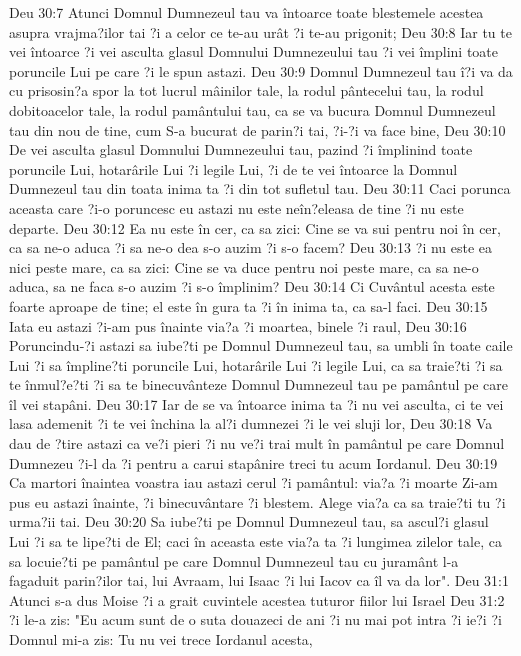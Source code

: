 Deu 30:7  Atunci Domnul Dumnezeul tau va întoarce toate blestemele acestea asupra vrajma?ilor tai ?i a celor ce te-au urât ?i te-au prigonit;
Deu 30:8  Iar tu te vei întoarce ?i vei asculta glasul Domnului Dumnezeului tau ?i vei împlini toate poruncile Lui pe care ?i le spun astazi.
Deu 30:9  Domnul Dumnezeul tau î?i va da cu prisosin?a spor la tot lucrul mâinilor tale, la rodul pântecelui tau, la rodul dobitoacelor tale, la rodul pamântului tau, ca se va bucura Domnul Dumnezeul tau din nou de tine, cum S-a bucurat de parin?i tai, ?i-?i va face bine,
Deu 30:10  De vei asculta glasul Domnului Dumnezeului tau, pazind ?i împlinind toate poruncile Lui, hotarârile Lui ?i legile Lui, ?i de te vei întoarce la Domnul Dumnezeul tau din toata inima ta ?i din tot sufletul tau.
Deu 30:11  Caci porunca aceasta care ?i-o poruncesc eu astazi nu este neîn?eleasa de tine ?i nu este departe.
Deu 30:12  Ea nu este în cer, ca sa zici: Cine se va sui pentru noi în cer, ca sa ne-o aduca ?i sa ne-o dea s-o auzim ?i s-o facem?
Deu 30:13  ?i nu este ea nici peste mare, ca sa zici: Cine se va duce pentru noi peste mare, ca sa ne-o aduca, sa ne faca s-o auzim ?i s-o împlinim?
Deu 30:14  Ci Cuvântul acesta este foarte aproape de tine; el este în gura ta ?i în inima ta, ca sa-l faci.
Deu 30:15  Iata eu astazi ?i-am pus înainte via?a ?i moartea, binele ?i raul,
Deu 30:16  Poruncindu-?i astazi sa iube?ti pe Domnul Dumnezeul tau, sa umbli în toate caile Lui ?i sa împline?ti poruncile Lui, hotarârile Lui ?i legile Lui, ca sa traie?ti ?i sa te înmul?e?ti ?i sa te binecuvânteze Domnul Dumnezeul tau pe pamântul pe care îl vei stapâni.
Deu 30:17  Iar de se va întoarce inima ta ?i nu vei asculta, ci te vei lasa ademenit ?i te vei închina la al?i dumnezei ?i le vei sluji lor,
Deu 30:18  Va dau de ?tire astazi ca ve?i pieri ?i nu ve?i trai mult în pamântul pe care Domnul Dumnezeu ?i-l da ?i pentru a carui stapânire treci tu acum Iordanul.
Deu 30:19  Ca martori înaintea voastra iau astazi cerul ?i pamântul: via?a ?i moarte Zi-am pus eu astazi înainte, ?i binecuvântare ?i blestem. Alege via?a ca sa traie?ti tu ?i urma?ii tai.
Deu 30:20  Sa iube?ti pe Domnul Dumnezeul tau, sa ascul?i glasul Lui ?i sa te lipe?ti de El; caci în aceasta este via?a ta ?i lungimea zilelor tale, ca sa locuie?ti pe pamântul pe care Domnul Dumnezeul tau cu juramânt l-a fagaduit parin?ilor tai, lui Avraam, lui Isaac ?i lui Iacov ca îl va da lor".
Deu 31:1  Atunci s-a dus Moise ?i a grait cuvintele acestea tuturor fiilor lui Israel
Deu 31:2  ?i le-a zis: "Eu acum sunt de o suta douazeci de ani ?i nu mai pot intra ?i ie?i ?i Domnul mi-a zis: Tu nu vei trece Iordanul acesta,
